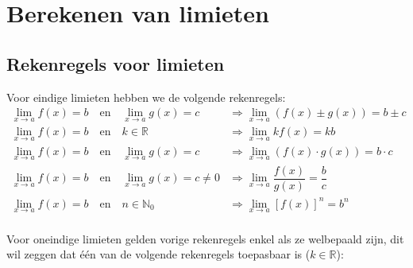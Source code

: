 \documentclass[12pt,twoside,a4paper]{article}
\begin{document}
\cleardoublepage
\section{Berekenen van limieten}

\subsection{Rekenregels voor limieten}

Voor eindige limieten hebben we de volgende rekenregels:
\begin{align*}
  \displaystyle\lim_{x\to a}f(x)=b\quad\mbox{en}\quad \lim_{x\to a}g(x)=c &\Rightarrow \lim_{x\to a}\left(f(x)\pm g(x)\right)=b\pm c\\
  \displaystyle\lim_{x\to a}f(x)=b\quad\mbox{en}\quad k\in\mathbb{R} &\Rightarrow \lim_{x\to a} kf(x)=kb\\
  \displaystyle\lim_{x\to a}f(x)=b\quad\mbox{en}\quad \lim_{x\to a}g(x)=c &\Rightarrow \lim_{x\to a}\left(f(x)\cdot g(x)\right)=b\cdot c\\
  \displaystyle\lim_{x\to a}f(x)=b\quad\mbox{en}\quad \lim_{x\to a}g(x)=c \neq 0 &\Rightarrow \lim_{x\to a}\dfrac{f(x)}{g(x)}=\dfrac{b}{c}\\
  \displaystyle\lim_{x\to a}f(x)=b\quad\mbox{en}\quad n\in\mathbb{N}_0 &\Rightarrow \lim_{x\to a} [f(x)]^n=b^n\\
\end{align*}

Voor oneindige limieten gelden vorige rekenregels enkel als ze welbepaald zijn, dit wil zeggen dat één van de volgende rekenregels toepasbaar is ($k\in\mathbb{R}$):
\end{document}
